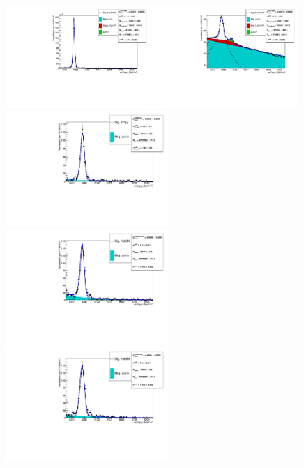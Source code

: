 \begin{figure}[h!]
\centering
\includegraphics[width=0.49\textwidth]{RKst/figs/Fit/fit_MM/KstJPsMM.pdf}
\includegraphics[width=0.49\textwidth]{RKst/figs/Fit/fit_MM/KstJPsMM_log.pdf}
\includegraphics[width=0.55\textwidth]{RKst/figs/Fit/fit_MM/KstMM_low.pdf}
\includegraphics[width=0.55\textwidth]{RKst/figs/Fit/fit_MM/KstMM_central.pdf}
\includegraphics[width=0.55\textwidth]{RKst/figs/Fit/fit_MM/KstMM_high.pdf}

\end{figure}
